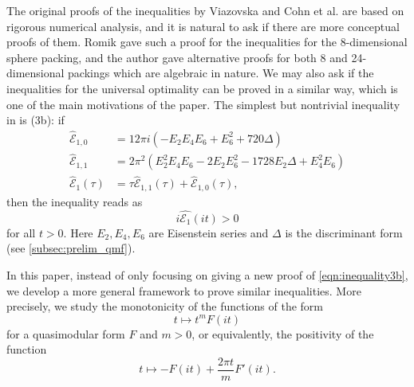\documentclass[10pt,reqno]{amsproc}
\newcommand{\what}[1]{\widehat{#1}}
\newcommand{\cE}{\mathcal{E}}
\newcommand{\1}{\mathds{1}}	%
\theoremstyle{definition}
\theoremstyle{remark}
\begin{document}
The original proofs of the inequalities by Viazovska and Cohn et al. are based on rigorous numerical analysis, and it is natural to ask if there are more conceptual proofs of them.
Romik \cite{romik2023viazovska} gave such a proof for the inequalities for the 8-dimensional sphere packing, and the author gave alternative proofs for both 8 and 24-dimensional packings \cite{lee2024algebraic} which are algebraic in nature.
We may also ask if the inequalities for the universal optimality can be proved in a similar way, which is one of the main motivations of the paper.
The simplest but nontrivial inequality in \cite[p. 1067]{cohn2022universal} is (3b): if
\begin{align}
    \what{\cE}_{1, 0} &= 12 \pi i (-E_2 E_4 E_6 + E_6^2 + 720 \Delta) \\
    \what{\cE}_{1, 1} &= 2 \pi^2 (E_2^2 E_4 E_6 - 2 E_2 E_6^2 - 1728 E_2 \Delta + E_4^2 E_6) \\
    \what{\cE}_{1}(\tau) &= \tau \what{\cE}_{1, 1}(\tau) + \what{\cE}_{1, 0}(\tau),
\end{align}
then the inequality reads as
\begin{equation}
    \label{eqn:inequality3b}
    i \what{\cE_{1}}(it) > 0
\end{equation}
for all $t > 0$.
Here $E_2, E_4, E_6$ are Eisenstein series and $\Delta$ is the discriminant form (see \ref{subsec:prelim_qmf}).

In this paper, instead of only focusing on giving a new proof of \eqref{eqn:inequality3b}, we develop a more general framework to prove similar inequalities.
More precisely, we study the monotonicity of the functions of the form
\begin{equation}
    t \mapsto t^m F(it) \label{eqn:tmf}
\end{equation}
for a quasimodular form $F$ and $m > 0$, or equivalently, the positivity of the function
\begin{equation}
    t \mapsto - F(it) + \frac{2 \pi t}{m} F'(it). \label{eqn:tmf_deriv}
\end{equation}
\end{document}
